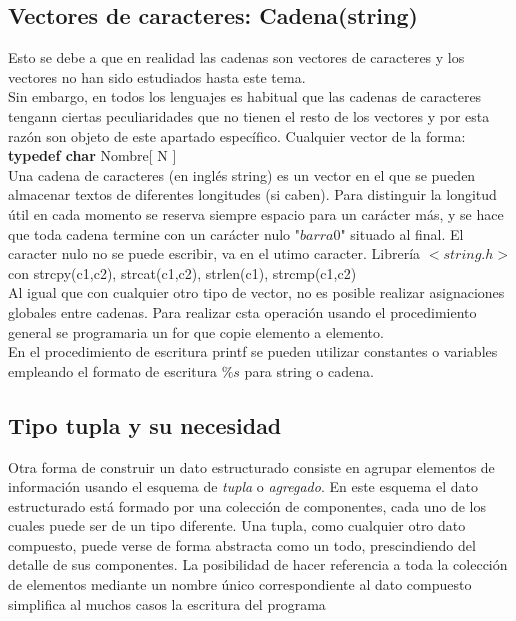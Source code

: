 \documentclass[11pt,a4paper]{article}
\begin{document}
  \subsection{Vectores de caracteres: Cadena(string)}
  Esto se debe a que en realidad las cadenas son vectores de caracteres y los vectores no han sido estudiados hasta este tema.\\
  Sin embargo, en todos los lenguajes es habitual que las cadenas de caracteres
  tengann ciertas peculiaridades que no tienen el resto de los vectores y por esta
  razón son objeto de este apartado específico. Cualquier vector de la forma: \textbf{typedef char} Nombre[ N ]\\
  Una cadena de caracteres (en inglés string) es un vector en el que se pueden
  almacenar textos de diferentes longitudes (si caben). Para distinguir
  la longitud útil en cada momento se reserva siempre espacio para un
  carácter más, y se hace que toda cadena termine con un carácter nulo
  "$barra 0$"  situado al final.
  El caracter nulo no se puede escribir, va en el utimo caracter. Librería $<string.h>$
  con strcpy(c1,c2), strcat(c1,c2), strlen(c1), strcmp(c1,c2)\\
  Al igual que con cualquier otro tipo de vector, no es posible realizar asignaciones globales entre cadenas. 
  Para realizar csta operación usando el procedimiento general se programaria
  un for que copie elemento a elemento.\\
  En el procedimiento de escritura printf se pueden utilizar constantes o variables empleando el formato de escritura $\%s$ para string o cadena.
  \subsection{Tipo tupla y su necesidad}
  Otra forma de construir un dato estructurado consiste en agrupar elementos
  de información usando el esquema de \textit{tupla} o \textit{agregado}.
  En este esquema el
  dato estructurado está formado por una colección de componentes, cada uno
  de los cuales puede ser de un tipo diferente.
  Una tupla, como cualquier otro dato compuesto,
  puede verse de forma abstracta como un todo, prescindiendo del detalle de sus
  componentes. La posibilidad de hacer referencia a toda la colección de elementos mediante
  un nombre único correspondiente al dato compuesto simplifica
  al muchos casos la escritura del programa
\end{document}
